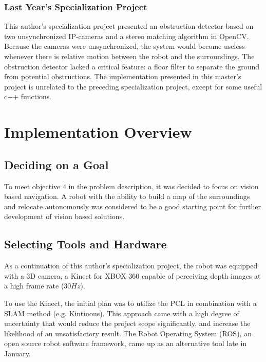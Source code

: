 \subsubsection{Last Year's Specialization Project}

This author's specialization project\cite{lindrup} presented an obstruction detector based on two unsynchronized IP-cameras and a stereo matching algorithm in \ac{OpenCV}. Because the cameras were unsynchronized, the system would become useless whenever there is relative motion between the robot and the surroundings. The obstruction detector lacked a critical feature: a floor filter to separate the ground from potential obstructions. The implementation presented in this master's project is unrelated to the preceding specialization project, except for some useful c++ functions.

\section{Implementation Overview}

\subsection{Deciding on a Goal}

To meet objective 4 in the problem description, it was decided to focus on vision based navigation. A robot with the ability to build a map of the surroundings and relocate autonomously was considered to be a good starting point for further development of vision based solutions.

\subsection{Selecting Tools and Hardware}

As a continuation of this author's specialization project, the robot was equipped with a 3D camera, a Kinect for XBOX 360 capable of perceiving depth images at a high frame rate ($30 Hz$). 

To use the Kinect, the initial plan was to utilize the \ac{PCL} in combination with a \ac{SLAM} method (e.g. Kintinous\cite{Kintinous}). This approach came with a high degree of uncertainty that would reduce the project scope significantly, and increase the likelihood of an unsatisfactory result. The Robot Operating System (ROS), an open source robot software framework, came up as an alternative tool late in January. 

